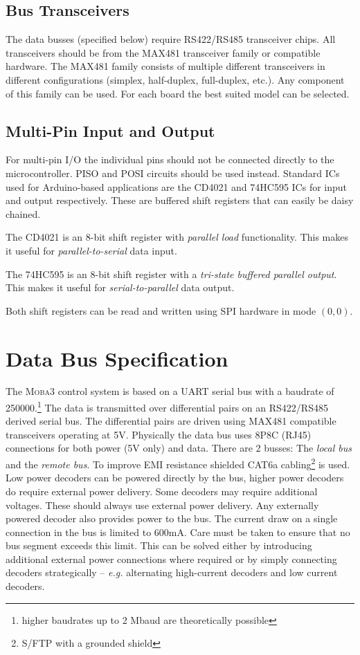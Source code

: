 \documentclass{scrreprt}
\newcommand\eg{\emph{e.g. }}
\begin{document}
\subsection{Bus Transceivers}
The data busses (specified below) require RS422/RS485 transceiver chips.
All transceivers should be from the MAX481 transceiver family or compatible hardware.
The MAX481 family consists of multiple different transceivers in different configurations (simplex, half-duplex, full-duplex, etc.).
Any component of this family can be used.
For each board the best suited model can be selected.

\subsection{Multi-Pin Input and Output}
For multi-pin I/O the individual pins should not be connected directly to the microcontroller.
PISO and POSI circuits should be used instead.
Standard ICs used for Arduino-based applications are the CD4021 and 74HC595 ICs for input and output respectively.
These are buffered shift registers that can easily be daisy chained.

The CD4021 is an 8-bit shift register with \emph{parallel load} functionality.
This makes it useful for \emph{parallel-to-serial} data input.

The 74HC595 is an 8-bit shift register with a \emph{tri-state buffered parallel output}.
This makes it useful for \emph{serial-to-parallel} data output.

Both shift registers can be read and written using SPI hardware in mode $(0,0)$.

\section{Data Bus Specification}
The \textsc{Moba3} control system is based on a UART serial bus with a baudrate of 250000.\footnote{higher baudrates up to 2 Mbaud are theoretically possible}
The data is transmitted over differential pairs on an RS422/RS485 derived serial bus.
The differential pairs are driven using MAX481 compatible transceivers operating at 5V.
Physically the data bus uses 8P8C (RJ45) connections for both power (5V only) and data.
There are 2 busses:
The \emph{local bus} and the \emph{remote bus}.
To improve EMI resistance shielded CAT6a cabling\footnote{S/FTP with a grounded shield} is used.
Low power decoders can be powered directly by the bus, higher power decoders do require external power delivery.
Some decoders may require additional voltages.
These should always use external power delivery.
Any externally powered decoder also provides power to the bus.
The current draw on a single connection in the bus is limited to 600mA.
Care must be taken to ensure that no bus segment exceeds this limit.
This can be solved either by introducing additional external power connections where required or by simply connecting decoders strategically -- \eg alternating high-current decoders and low current decoders.
\end{document}
